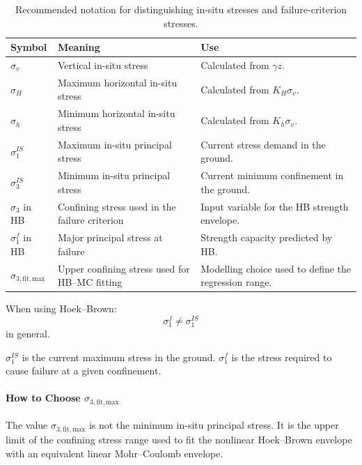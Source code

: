 \begin{table}[H]
\centering
\small
\begin{tabularx}{\textwidth}{l l Y}
\toprule
\textbf{Symbol} & \textbf{Meaning} & \textbf{Use} \\
\midrule
\(\sigma_v\) & Vertical in-situ stress & Calculated from \(\gamma z\). \\
\(\sigma_H\) & Maximum horizontal in-situ stress & Calculated from \(K_H\sigma_v\). \\
\(\sigma_h\) & Minimum horizontal in-situ stress & Calculated from \(K_h\sigma_v\). \\
\(\sigma_1^{IS}\) & Maximum in-situ principal stress & Current stress demand in the ground. \\
\(\sigma_3^{IS}\) & Minimum in-situ principal stress & Current minimum confinement in the ground. \\
\(\sigma_3\) in HB & Confining stress used in the failure criterion & Input variable for the HB strength envelope. \\
\(\sigma_1^f\) in HB & Major principal stress at failure & Strength capacity predicted by HB. \\
\(\sigma_{3,\mathrm{fit,max}}\) & Upper confining stress used for HB--MC fitting & Modelling choice used to define the regression range. \\
\bottomrule
\end{tabularx}
\caption{Recommended notation for distinguishing in-situ stresses and failure-criterion stresses.}
\end{table}

\begin{warnbox}
When using Hoek--Brown:
\[
\sigma_1^f \neq \sigma_1^{IS}
\]
in general.

\(\sigma_1^{IS}\) is the current maximum stress in the ground. 
\(\sigma_1^f\) is the stress required to cause failure at a given confinement.
\end{warnbox}

\paragraph{How to Choose \(\sigma_{3,\mathrm{fit,max}}\)}

The value \(\sigma_{3,\mathrm{fit,max}}\) is not the minimum in-situ principal stress.
It is the upper limit of the confining stress range used to fit the nonlinear
Hoek--Brown envelope with an equivalent linear Mohr--Coulomb envelope.

